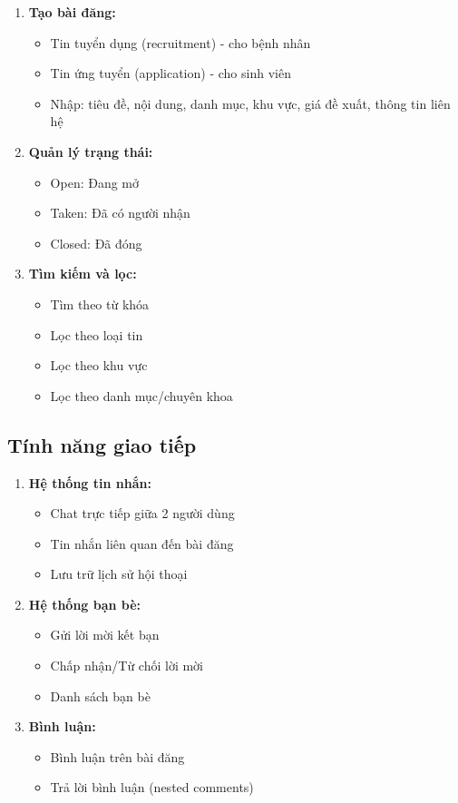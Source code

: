 \documentclass[a4paper,12pt]{article}
\begin{document}
\begin{enumerate}
    \item \textbf{Tạo bài đăng:}
    \begin{itemize}
        \item Tin tuyển dụng (recruitment) - cho bệnh nhân
        \item Tin ứng tuyển (application) - cho sinh viên
        \item Nhập: tiêu đề, nội dung, danh mục, khu vực, giá đề xuất, thông tin liên hệ
    \end{itemize}
    
    \item \textbf{Quản lý trạng thái:}
    \begin{itemize}
        \item Open: Đang mở
        \item Taken: Đã có người nhận
        \item Closed: Đã đóng
    \end{itemize}
    
    \item \textbf{Tìm kiếm và lọc:}
    \begin{itemize}
        \item Tìm theo từ khóa
        \item Lọc theo loại tin
        \item Lọc theo khu vực
        \item Lọc theo danh mục/chuyên khoa
    \end{itemize}
\end{enumerate}

\subsection{Tính năng giao tiếp}

\begin{enumerate}
    \item \textbf{Hệ thống tin nhắn:}
    \begin{itemize}
        \item Chat trực tiếp giữa 2 người dùng
        \item Tin nhắn liên quan đến bài đăng
        \item Lưu trữ lịch sử hội thoại
    \end{itemize}
    
    \item \textbf{Hệ thống bạn bè:}
    \begin{itemize}
        \item Gửi lời mời kết bạn
        \item Chấp nhận/Từ chối lời mời
        \item Danh sách bạn bè
    \end{itemize}
    
    \item \textbf{Bình luận:}
    \begin{itemize}
        \item Bình luận trên bài đăng
        \item Trả lời bình luận (nested comments)
    \end{itemize}
\end{enumerate}
\end{document}
